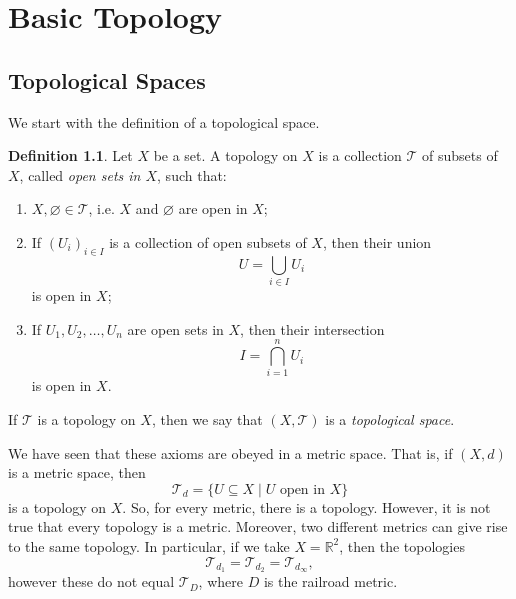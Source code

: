 \documentclass[a4paper, openany]{memoir}
\theoremstyle{definition}
\newtheorem{definition}{Definition}[section]
\theoremstyle{plain}
\begin{document}
\chapter{Basic Topology}
\section{Topological Spaces}
We start with the definition of a topological space.
\begin{definition}
Let $X$ be a set. A topology on $X$ is a collection $\mathcal{T}$ of subsets of $X$, called \emph{open sets in $X$}, such that:
\begin{enumerate}[label=\textbf{T\arabic*}.]
    \item $X, \varnothing \in \mathcal{T}$, i.e. $X$ and $\varnothing$ are open in $X$;
    
    \item If $(U_i)_{i \in I}$ is a collection of open subsets of $X$, then their union
    \[U = \bigcup_{i \in I} U_i\]
    is open in $X$;
    
    \item If $U_1, U_2, \dots, U_n$ are open sets in $X$, then their intersection
    \[I = \bigcap_{i = 1}^n U_i\]
    is open in $X$.
\end{enumerate}
If $\mathcal{T}$ is a topology on $X$, then we say that $(X, \mathcal{T})$ is a \emph{topological space}.
\end{definition}
\noindent We have seen that these axioms are obeyed in a metric space. That is, if $(X, d)$ is a metric space, then
\[\mathcal{T}_d = \{U \subseteq X \mid U \text{ open in } X\}\]
is a topology on $X$. So, for every metric, there is a topology. However, it is not true that every topology is a metric. Moreover, two different metrics can give rise to the same topology. In particular, if we take $X = \mathbb{R}^2$, then the topologies
\[\mathcal{T}_{d_1} = \mathcal{T}_{d_2} = \mathcal{T}_{d_\infty},\]
however these do not equal $\mathcal{T}_{D}$, where $D$ is the railroad metric.
\end{document}
